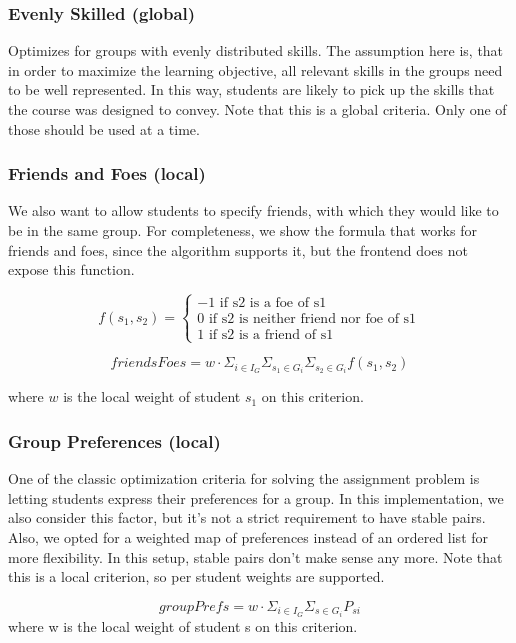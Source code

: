 \subsubsection{Evenly Skilled \small{(global)}}
Optimizes for groups with evenly distributed skills. The assumption here is, that in order to maximize the learning objective, all relevant skills in the groups need to be well represented. In this way, students are likely to pick up the skills that the course was designed to convey. Note that this is a global criteria. Only one of those should be used at a time.


\subsubsection{Friends and Foes \small{(local)}}
We also want to allow students to specify friends, with which they would like to be in the same group. For completeness, we show the formula that works for friends and foes, since the algorithm supports it, but the frontend does not expose this function.

$$f(s_1, s_2) = 
\begin{cases}  
	-1 \textrm{ if s2 is a foe of s1} \\ 
	0 \textrm{ if s2 is neither friend nor foe of s1} \\ 
	1 \textrm{ if s2 is a friend of s1} 
\end{cases}
$$

$$ friendsFoes = w \cdot \Sigma_{i\in I_G} \Sigma_{s_1\in G_i} \Sigma_{s_2\in G_i} f(s_1, s_2) $$

where $w$ is the local weight of student $s_1$ on this criterion.

\subsubsection{Group Preferences \small{(local)}}
One of the classic optimization criteria for solving the assignment problem is letting students express their preferences for a group. In this implementation, we also consider this factor, but it's not a strict requirement to have stable pairs. Also, we opted for a weighted map of preferences instead of an ordered list for more flexibility. In this setup, stable pairs don't make sense any more. Note that this is a local criterion, so per student weights are supported.

$$ groupPrefs = w \cdot \Sigma_{i\in I_G} \Sigma_{s\in G_i} P_{si} $$
where w is the local weight of student s on this criterion.

